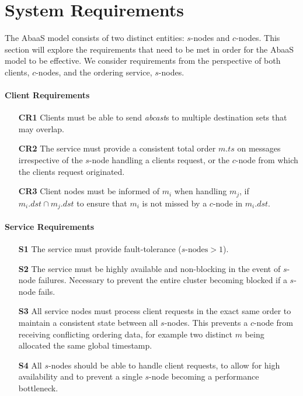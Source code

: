 \section{System Requirements}\label{sec:absaas_requirements}
The \textsf{AbaaS} model consists of two distinct entities: $s$-nodes and $c$-nodes.  This section will explore the requirements that need to be met in order for the \textsf{AbaaS} model to be effective.  We consider requirements from the perspective of both clients, $c$-nodes, and the ordering service, $s$-nodes.

	\paragraph{Client Requirements} \hspace{0pt}
	\begin{itemize}
		\item [\textbf{CR1}] Clients must be able to send \emph{abcast}s to multiple destination sets that may overlap.
		
		\item [\textbf{CR2}] The service must provide a consistent total order $m.ts$ on messages irrespective of the $s$-node handling a clients request, or the $c$-node from which the clients request originated.  
		
		\item [\textbf{CR3}] Client nodes must be informed of $m_i$ when handling $m_j$, if $m_i.dst \cap m_j.dst$ to ensure that $m_i$ is not missed by a $c$-node in $m_i.dst$.  
	\end{itemize}
	
	\paragraph{Service Requirements} \hspace{0pt}
	\begin{itemize}
		\item [\textbf{S1}] The service must provide fault-tolerance ($s\text{-nodes} > 1$).
		
		\item [\textbf{S2}] The service must be highly available and non-blocking in the event of $s$-node failures.  Necessary to prevent the entire cluster becoming blocked if a $s$-node fails.   
		
		\item [\textbf{S3}] All service nodes must process client requests in the exact same order to maintain a consistent state between all $s$-nodes.  This prevents a $c$-node from receiving conflicting ordering data, for example two distinct $m$ being allocated the same global timestamp.  
		
		\item [\textbf{S4}] All $s$-nodes should be able to handle client requests, to allow for high availability and to prevent a single $s$-node becoming a performance bottleneck.
	\end{itemize}

